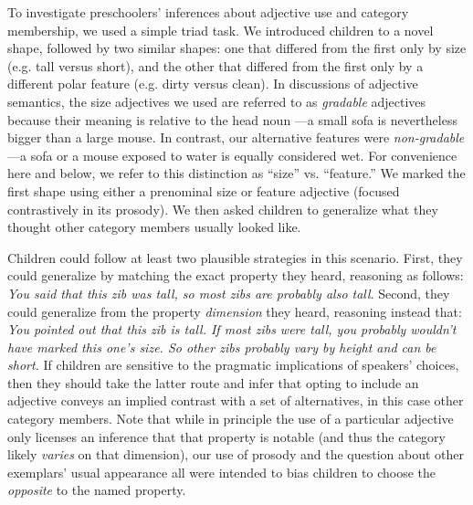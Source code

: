 \documentclass[man]{apa2}
\begin{document}
To investigate preschoolers' inferences about adjective use and category membership, we used a simple triad task.  We introduced children to a novel shape, followed by two similar shapes: one that differed from the first only by size (e.g. tall versus short), and the other that differed from the first only by a different polar feature (e.g. dirty versus clean). In discussions of adjective semantics, the size adjectives we used are referred to as \emph{gradable} adjectives because their meaning is relative to the head noun \cite{kennedy2012}---a small sofa is nevertheless bigger than a large mouse. In contrast, our alternative features were \emph{non-gradable}---a sofa or a mouse exposed to water is equally considered wet. For convenience here and below, we refer to this distinction as ``size'' vs. ``feature.'' We marked the first shape using either a prenominal size or feature adjective (focused contrastively in its prosody). We then asked children to generalize what they thought other category members usually looked like. 

Children could follow at least two plausible strategies in this scenario. First, they could generalize by matching the exact property they heard, reasoning as follows: \emph{You said that this zib was tall, so most zibs are probably also tall}. Second, they could generalize from the property \emph{dimension} they heard, reasoning instead that: \emph{You pointed out that this zib is tall. If most zibs were tall, you probably wouldn't have marked this one's size. So other zibs probably vary by height and can be short.} If children are sensitive to the pragmatic implications of speakers' choices, then they should take the latter route and infer that opting to include an adjective conveys an implied contrast with a set of alternatives, in this case other category members. Note that while in principle the use of a particular adjective only licenses an inference that that property is notable (and thus the category likely \emph{varies} on that dimension), our use of prosody and the question about other exemplars' usual appearance all were intended to bias children to choose the \emph{opposite} to the named property.


\end{document}
